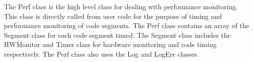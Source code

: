 %



The Perf class is the high level class for dealing with
performance monitoring. This class is directly called from
user code for the purpose of timing and performance monitoring
of code segments. The Perf class contains an array of the Segment class
for each code segment timed. The Segment class includes the HWMonitor
and Timer class for hardware monitoring and code timing respectively.
The Perf class also uses the Log and LogErr classes.
